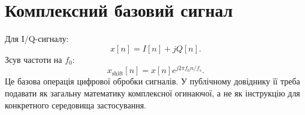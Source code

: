 \section{Комплексний базовий сигнал}

Для I/Q-сигналу:
\[
x[n]=I[n]+jQ[n].
\]
Зсув частоти на $f_0$:
\[
x_{\mathrm{shift}}[n]=x[n]e^{j2\pi f_0n/f_s}.
\]
Це базова операція цифрової обробки сигналів. У публічному довіднику її треба подавати як загальну математику комплексної огинаючої, а не як інструкцію для конкретного середовища застосування.
